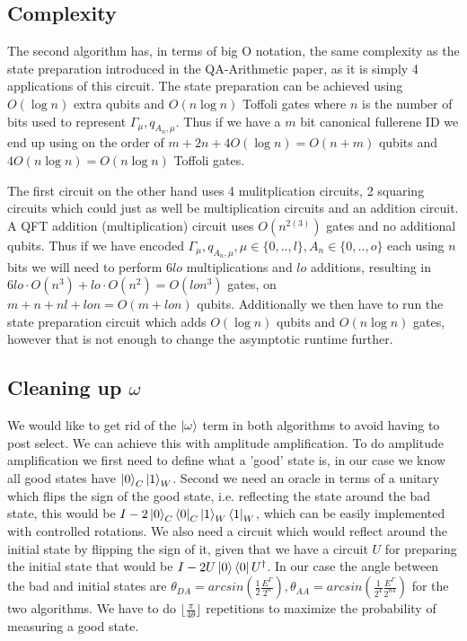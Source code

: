 \subsection{Complexity}
The second algorithm has, in terms of big O notation, the same complexity as the state preparation introduced in the QA-Arithmetic paper, as it is simply 4 applications of this circuit. The state preparation can be achieved using $O(\log n)$ extra qubits and $O(n\log n)$ Toffoli gates where $n$ is the number of bits used to represent $\varGamma_\mu, q_{A_n,\mu}$. Thus if we have a $m$ bit canonical fullerene ID we end up using on the order of $m+2n+4O(\log n)=O(n+m)$ qubits and $4O(n \log n)=O(n \log n)$ Toffoli gates. 

The first circuit on the other hand uses 4 mulitplication circuits, 2 squaring circuits which could just as well be multiplication circuits and an addition circuit. A QFT addition (multiplication) circuit uses $O(n^{2(3)})$ gates and no additional qubits. Thus if we have encoded $\varGamma_{\mu},q_{A_n,\mu}, \mu \in \{0,..,l\}, A_n \in \{0,..,o\}$ each using $n$ bits we will need to perform $6lo$ multiplications and $lo$ additions, resulting in $6lo\cdot O(n^3)+lo\cdot O(n^2)=O(lon^3)$ gates, on $m+n+nl+lon = O(m+lon)$ qubits.
Additionally we then have to run the state preparation circuit which adds $O(\log n)$ qubits and $O(n\log n)$ gates, however that is not enough to change the asymptotic runtime further. 

\subsection{Cleaning up $\omega$}
We would like to get rid of the $\ket{\omega}$ term in both algorithms to avoid having to post select.
We can achieve this with amplitude amplification. 
To do amplitude amplification we first need to define what a 'good' state is, in our case we know all good states have $\ket{0}_C\ket{1}_W$. 
Second we need an oracle in terms of a unitary which flips the sign of the good state, i.e. reflecting the state around the bad state, this would be $I-2\ket{0}_C\bra{0}_C\ket{1}_W\bra{1}_W$, which can be easily implemented with controlled rotations. 
We also need a circuit which would reflect around the initial state by flipping the sign of it, given that we have a circuit $U$ for preparing the initial state that would be $I-2U\ket{0}\bra{0}U^\dagger$.
In our case the angle between the bad and initial states are $\theta_{DA} = arcsin(\frac{1}{2}\frac{E^\Gamma}{2^n}),\theta_{AA} = arcsin(\frac{1}{2^4}\frac{E^\Gamma}{2^{n4}})$ for the two algorithms. We have to do $\lfloor\frac{\pi}{4\theta}\rfloor$ repetitions to maximize the probability of measuring a good state.%
